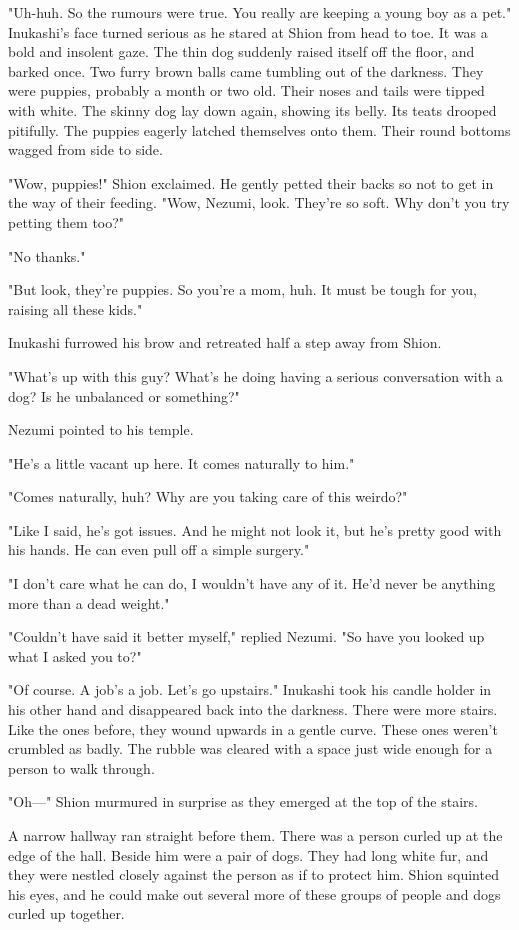 "Uh-huh. So the rumours were true. You really are keeping a young boy as
a pet." Inukashi's face turned serious as he stared at Shion from head
to toe. It was a bold and insolent gaze. The thin dog suddenly raised
itself off the floor, and barked once. Two furry brown balls came
tumbling out of the darkness. They were puppies, probably a month or two
old. Their noses and tails were tipped with white. The skinny dog lay
down again, showing its belly. Its teats drooped pitifully. The puppies
eagerly latched themselves onto them. Their round bottoms wagged from
side to side.

"Wow, puppies!" Shion exclaimed. He gently petted their backs so not to
get in the way of their feeding. "Wow, Nezumi, look. They're so soft.
Why don't you try petting them too?"

"No thanks."

"But look, they're puppies. So you're a mom, huh. It must be tough for
you, raising all these kids."

Inukashi furrowed his brow and retreated half a step away from Shion.

"What's up with this guy? What's he doing having a serious conversation
with a dog? Is he unbalanced or something?"

Nezumi pointed to his temple.

"He's a little vacant up here. It comes naturally to him."

"Comes naturally, huh? Why are you taking care of this weirdo?"

"Like I said, he's got issues. And he might not look it, but he's pretty
good with his hands. He can even pull off a simple surgery."

"I don't care what he can do, I wouldn't have any of it. He'd never be
anything more than a dead weight."

"Couldn't have said it better myself," replied Nezumi. "So have you
looked up what I asked you to?"

"Of course. A job's a job. Let's go upstairs." Inukashi took his candle
holder in his other hand and disappeared back into the darkness. There
were more stairs. Like the ones before, they wound upwards in a gentle
curve. These ones weren't crumbled as badly. The rubble was cleared with
a space just wide enough for a person to walk through.

"Oh---" Shion murmured in surprise as they emerged at the top of the
stairs.

A narrow hallway ran straight before them. There was a person curled up
at the edge of the hall. Beside him were a pair of dogs. They had long
white fur, and they were nestled closely against the person as if to
protect him. Shion squinted his eyes, and he could make out several more
of these groups of people and dogs curled up together.

